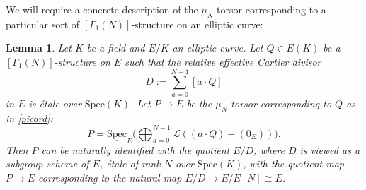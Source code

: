 \documentclass[11pt]{amsart}
\newtheorem{lemma}[subsection]{Lemma}
\theoremstyle{definition}
\begin{document}
We will require a concrete description of the $\mu_N$-torsor corresponding to a particular sort of $[\Gamma_1(N)]$-structure on an elliptic curve:

\begin{lemma}\label{quotient}
Let $K$ be a field and $E/K$ an elliptic curve. Let $Q \in E(K)$ be a $[\Gamma_1(N)]$-structure on $E$ such that the relative effective Cartier divisor 
\begin{displaymath}
D := \sum_{a = 0}^{N-1} [a\cdot Q]
\end{displaymath}
in $E$ is \'etale over $\mathrm{Spec}(K)$. Let $P \rightarrow E$ be the $\mu_N$-torsor corresponding to $Q$ as in \ref{picard}:
\begin{displaymath}
P = \underline{\mathrm{Spec}}_E \big( \bigoplus_{a = 0}^{N-1} {\mathcal{L}}( (a \cdot Q)-(0_E)) \big).
\end{displaymath}
Then $P$ can be naturally identified with the quotient $E/D$, where $D$ is viewed as a subgroup scheme of $E$, \'etale of rank $N$ over $\mathrm{Spec}(K)$, with the quotient map $P \rightarrow E$ corresponding to the natural map $E/D \rightarrow E/E[N] \cong E$.
\end{lemma}
\end{document}
